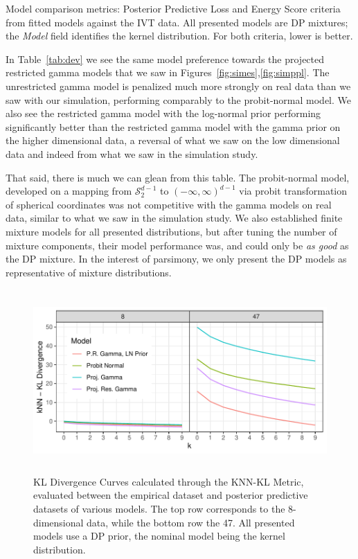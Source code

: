 \begin{table}[b]
  \centering
  \caption{Model comparison metrics: Posterior Predictive Loss and Energy Score criteria from fitted
    models against the IVT data.  All presented models are DP mixtures; the \emph{Model} field
    identifies the kernel distribution.  For both criteria, lower is better.
  \label{tab:dev}}
  
\end{table}

In Table~\ref{tab:dev} we see the same model preference towards the projected restricted gamma models
  that we saw in Figures~\ref{fig:simes},\ref{fig:simppl}.  The unrestricted gamma model is penalized much
  more strongly on real data than we saw with our simulation, performing comparably to the probit-normal
  model.  We also see the restricted gamma model with the log-normal prior performing significantly
  better than the restricted gamma model with the gamma prior on the higher dimensional data, a reversal
  of what we saw on the low dimensional data and indeed from what we saw in the simulation study.

That said, there is much we can glean from this table.  The probit-normal model, developed on a
  mapping from $\mathcal{S}_{2}^{d-1}$ to $(-\infty,\infty)^{d-1}$ via probit transformation of
  spherical coordinates was not competitive with the gamma models on real data, similar to what we
  saw in the simulation study. We also established finite mixture models for all presented
  distributions, but after tuning the number of mixture components, their model performance was,
  and could only be \emph{as good} as the DP mixture.  In the interest of parsimony, we only present
  the DP models as representative of mixture distributions.

\begin{figure}[ht]
  \centering
  \caption{KL Divergence Curves calculated through the KNN-KL Metric, evaluated between the
  empirical dataset and posterior predictive datasets of various models.  The top row corresponds
  to the 8-dimensional data, while the bottom row the 47.  All presented models use a DP prior,
  the nominal model being the kernel distribution.\label{fig:knnkl}}
  \includegraphics[width = 5.5in, height = 2.75in]{./images/knn_kld}
\end{figure}

